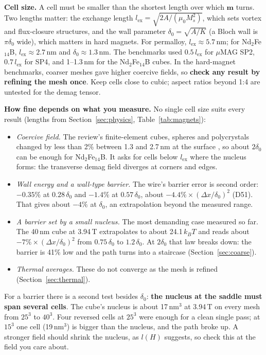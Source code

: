 \documentclass[10pt,a4paper]{article}
\newcommand{\mo}{\mu_0}
\newcommand{\vm}{\mathbf{m}}
\newcommand{\dec}[1]{\textcolor{comment}{\small(#1)}}
\begin{document}
\textbf{Cell size.} A cell must be smaller than the shortest length over which $\vm$ turns. Two lengths matter:
the exchange length $l_\mathrm{ex} = \sqrt{2A/(\mo M_s^2)}$, which sets vortex and flux-closure structures, and the
wall parameter $\delta_0 = \sqrt{A/K}$ (a Bloch wall is $\pi\delta_0$ wide), which matters in hard magnets. For
permalloy, $l_\mathrm{ex}\approx 5.7$\,nm; for Nd$_2$Fe$_{14}$B, $l_\mathrm{ex}\approx 2.7$\,nm and
$\delta_0\approx 1.3$\,nm. The benchmarks used $0.5\,l_\mathrm{ex}$ for $\mu$MAG SP2, $0.7\,l_\mathrm{ex}$ for SP4, and
1--1.3\,nm for the Nd$_2$Fe$_{14}$B cubes. In the hard-magnet benchmarks, coarser meshes gave higher coercive fields, so
\textbf{check any result by refining the mesh once}. Keep cells close to cubic; aspect ratios beyond 1:4 are untested
for the demag tensor.

\textbf{How fine depends on what you measure.} No single cell size suits every result (lengths from
Section~\ref{sec:physics}, Table~\ref{tab:magnets}):
\begin{itemize}[nosep]
  \item \emph{Coercive field.} The review's finite-element cubes, spheres and polycrystals changed by less than 2\% between
        1.3 and 2.7\,nm at the surface \cite{fischbacher2018}, so about $2\delta_0$ can be enough for Nd$_2$Fe$_{14}$B. It asks
        for cells below $l_\mathrm{ex}$ where the nucleus forms: the transverse demag field diverges at corners and edges.
  \item \emph{Wall energy and a wall-type barrier.} The wire's barrier error is second order: $-0.35\%$ at $0.28\,\delta_0$ and $-1.4\%$
        at $0.57\,\delta_0$, about $-4.4\%\times(\Delta x/\delta_0)^2$ \dec{D51}. That gives about $-4\%$ at $\delta_0$, an extrapolation
        beyond the measured range.
  \item \emph{A barrier set by a small nucleus.} The most demanding case measured so far. The 40\,nm cube at 3.94\,T extrapolates to about
        24.1\,$k_BT$ and reads about $-7\%\times(\Delta x/\delta_0)^2$ from $0.75\,\delta_0$ to $1.2\,\delta_0$. At $2\delta_0$ that law
        breaks down: the barrier is 41\% low and the path turns into a staircase (Section~\ref{sec:coarse}).
  \item \emph{Thermal averages.} These do not converge as the mesh is refined (Section~\ref{sec:thermal}).
\end{itemize}
For a barrier there is a second test besides $\delta_0$: \textbf{the nucleus at the saddle must span several cells}. The cube's
nucleus is about 17\,nm$^3$ at 3.94\,T on every mesh from $25^3$ to $40^3$. Four reversed cells at $25^3$ were enough for a clean
single pass; at $15^3$ one cell (19\,nm$^3$) is bigger than the nucleus, and the path broke up. A stronger field should shrink the
nucleus, as $l(H)$ suggests, so check this at the field you care about.
\end{document}

